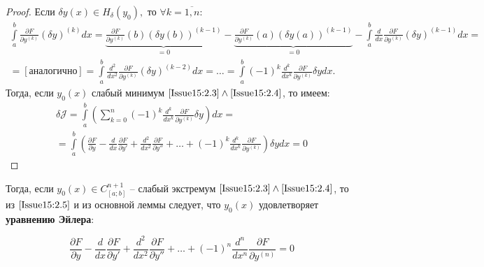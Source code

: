 \begin{proof}
	Если $\delta y(x)\in H_\delta(y_0),$ то $\forall k=\overline{1,n}:$
	\begin{multline*}
		\int\limits_a^b\frac{\partial F}{\partial y^{(k)}}(\delta y)^{(k)}dx = \underbrace{\frac{\partial F}{\partial y^{(k)}}(b)(\delta y(b))^{(k-1)}}_{=0}-\underbrace{\frac{\partial F}{\partial y^{(k)}}(a)(\delta y(a))^{(k-1)}}_{=0}-\int\limits_a^b\frac{d}{dx}\frac{\partial F}{\partial y^{(k)}}(\delta y)^{(k-1)}dx= \\ 
		=[\text{аналогично}]=\int\limits_a^b \frac{d^2}{dx^2}\frac{\partial F}{\partial y^{(k)}}(\delta y)^{(k-2)}dx=\dots=\int\limits^b_a\left(-1\right)^k\frac{d^k}{dx^k}\frac{\partial F}{\partial y^{(k)}}\delta y dx.
	\end{multline*}
	Тогда, если $y_0(x)$ слабый минимум $\eqref{Issue15:2.3}\wedge\eqref{Issue15:2.4}$, то имеем: 
	\begin{multline}
		\label{Issue15:2.5}
		\delta\mathcal{J} = \int\limits_a^b\left(\sum_{k=0}^n(-1)^k\frac{d^k}{dx^k}\frac{\partial F}{\partial y^{(k)}}\delta y\right) dx = \\
		= \int\limits_a^b\left(\frac{\partial F}{\partial y}-\frac{d}{dx}\frac{\partial F}{\partial y'}+\frac{d^2}{dx^2}\frac{\partial F}{\partial y''}+\dots+ (-1)^k\frac{d^k}{dx^k}\frac{\partial F}{\partial y^{(k)}}\right)\delta y dx=0
	\end{multline}
\end{proof}

Тогда, если $y_0(x)\in C^{n+1}_{[a;b]}$ -- слабый экстремум $\eqref{Issue15:2.3}\wedge\eqref{Issue15:2.4}$, то из $\eqref{Issue15:2.5}$ и из основной леммы следует, что $y_0(x)$ удовлетворяет \textbf{уравнению Эйлера}:

\begin{equation}
	\label{Issue15:2.6}
	\frac{\partial F}{\partial y} - \frac{d}{dx}\frac{\partial F}{\partial y'}+\frac{d^2}{dx^2}\frac{\partial F}{\partial y''}+\dots+(-1)^n\frac{d^n}{dx^n}\frac{\partial F}{\partial y^{(n)}}=0
\end{equation}

